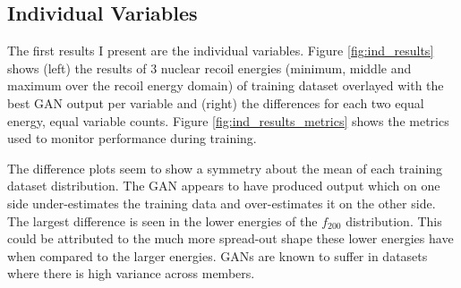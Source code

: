 \documentclass[11pt]{article} %
\begin{document}
\subsection{Individual Variables}
The first results I present are the individual variables.
Figure \ref{fig:ind_results} shows (left) the results of 3 nuclear recoil energies (minimum, middle and maximum over the recoil energy domain)
of training dataset overlayed with the best GAN output per variable and
(right) the differences for each two equal energy, equal variable counts.
Figure \ref{fig:ind_results_metrics} shows the metrics used to monitor performance during training.
\\
\par The difference plots seem to show a symmetry about the mean of each training dataset distribution.
The GAN appears to have produced output which on one side under-estimates the training data and over-estimates it
on the other side.
The largest difference is seen in the lower energies of the $f_{200}$ distribution.
This could be attributed to the much more spread-out shape these lower energies have when compared to the larger energies.
GANs are known to suffer in datasets where there is high variance across members.
\end{document}
